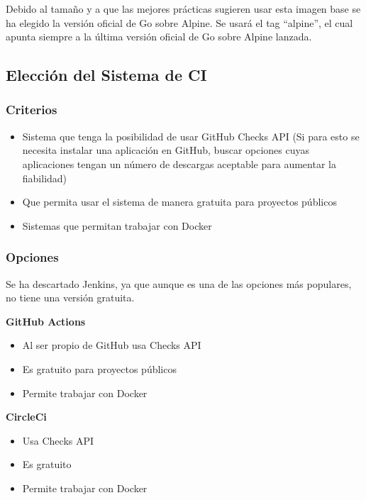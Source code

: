 Debido al tamaño y a que las mejores prácticas sugieren usar esta imagen
base se ha elegido la versión oficial de Go sobre Alpine. Se usará el
tag ``alpine'', el cual apunta siempre a la última versión oficial de Go
sobre Alpine lanzada.

\newpage
\subsection{Elección del Sistema de CI}

\subsubsection{Criterios}

\begin{itemize}
\item
  Sistema que tenga la posibilidad de usar GitHub Checks API (Si para
  esto se necesita instalar una aplicación en GitHub, buscar opciones
  cuyas aplicaciones tengan un número de descargas aceptable para
  aumentar la fiabilidad)
\item
  Que permita usar el sistema de manera gratuita para proyectos públicos
\item
  Sistemas que permitan trabajar con Docker
\end{itemize}

\subsubsection{Opciones}

Se ha descartado Jenkins, ya que aunque es una de las opciones más
populares, no tiene una versión gratuita.

\textbf{GitHub Actions \cite{actions}}

\begin{itemize}
\item
  Al ser propio de GitHub usa Checks API
\item
  Es gratuito para proyectos públicos
\item
  Permite trabajar con Docker
\end{itemize}

\textbf{CircleCi \cite{circle-ci}}

\begin{itemize}
\item
  Usa Checks API
\item
  Es gratuito
\item
  Permite trabajar con Docker
\end{itemize}

